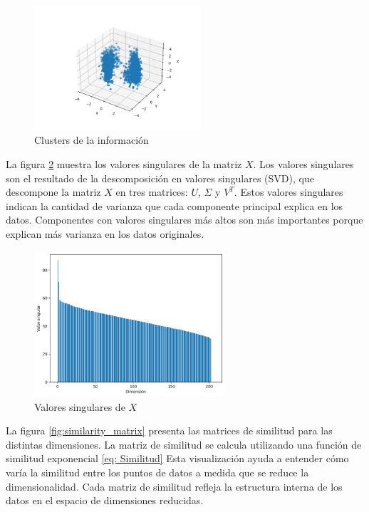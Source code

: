 \documentclass[12pt,a4]{article} %
\begin{document}
\begin{figure}[H]
    \centering
    \includegraphics[width=0.55\textwidth]{latex_project/plots1/Clusters_informacion.png}
    \caption{Clusters de la información}
    \label{fig:clusters_originals}
\end{figure}

La figura \ref{fig:valores_singulares_X} muestra los valores singulares de la matriz $X$. Los valores singulares son el resultado de la descomposición en valores singulares (SVD), que descompone la matriz $X$ en tres matrices: $U$, $\Sigma$ y $V^T$. Estos valores singulares indican la cantidad de varianza que cada componente principal explica en los datos. Componentes con valores singulares más altos son más importantes porque explican más varianza en los datos originales.

\begin{figure}[H]
    \centering
    \includegraphics[width=0.63\textwidth]{latex_project/plots1/valores_singulares_martrizFULL.png}
    \caption{Valores singulares de $X$}
    \label{fig:valores_singulares_X}
\end{figure}

La figura \ref{fig:similarity_matrix} presenta las matrices de similitud para las distintas dimensiones. La matriz de similitud se calcula utilizando una función de similitud exponencial \ref{eq: Similitud} Esta visualización ayuda a entender cómo varía la similitud entre los puntos de datos a medida que se reduce la dimensionalidad. Cada matriz de similitud refleja la estructura interna de los datos en el espacio de dimensiones reducidas.
\\
\end{document}
